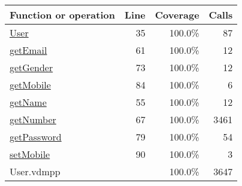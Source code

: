 \bigskip
\begin{longtable}{|l|r|r|r|}
\hline
Function or operation & Line & Coverage & Calls \\
\hline
\hline
\hyperref[User:35]{User} & 35&100.0\% & 87 \\
\hline
\hyperref[getEmail:61]{getEmail} & 61&100.0\% & 12 \\
\hline
\hyperref[getGender:73]{getGender} & 73&100.0\% & 12 \\
\hline
\hyperref[getMobile:84]{getMobile} & 84&100.0\% & 6 \\
\hline
\hyperref[getName:55]{getName} & 55&100.0\% & 12 \\
\hline
\hyperref[getNumber:67]{getNumber} & 67&100.0\% & 3461 \\
\hline
\hyperref[getPassword:79]{getPassword} & 79&100.0\% & 54 \\
\hline
\hyperref[setMobile:90]{setMobile} & 90&100.0\% & 3 \\
\hline
\hline
User.vdmpp & & 100.0\% & 3647 \\
\hline
\end{longtable}

